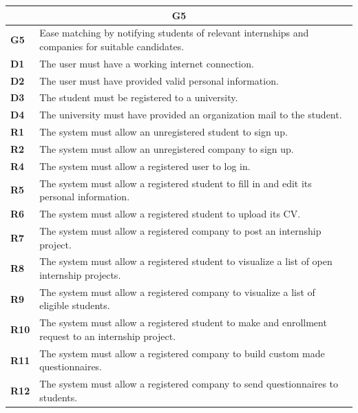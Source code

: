 \begin{table}[H]
    \centering
    \begin{tabular}{|l|m{10cm}|}
        \hline \multicolumn{2}{|c|}{\textbf{G5}} \\
        \hline \textbf{G5} & Ease matching by notifying students of relevant internships and companies for suitable candidates. \\
        \hline \textbf{D1} & The user must have a working internet connection. \\
        \hline \textbf{D2} & The user must have provided valid personal information. \\
        \hline \textbf{D3} & The student must be registered to a university. \\
        \hline \textbf{D4} & The university must have provided an organization mail to the student. \\
        \hline \textbf{R1} & The system must allow an unregistered student to sign up.\\
        \hline \textbf{R2} & The system must allow an unregistered company to sign up. \\
        \hline \textbf{R4} & The system must allow a registered user to log in. \\
        \hline \textbf{R5} & The system must allow a registered student to fill in and edit its personal information. \\
        \hline \textbf{R6} & The system must allow a registered student to upload its CV. \\
        \hline \textbf{R7} & The system must allow a registered company to post an internship project. \\
        \hline \textbf{R8} & The system must allow a registered student to visualize a list of open internship projects. \\
        \hline \textbf{R9} & The system must allow a registered company to visualize a list of eligible students. \\
        \hline \textbf{R10} & The system must allow a registered student to make and enrollment request to an internship project. \\
        \hline \textbf{R11} & The system must allow a registered company to build custom made questionnaires. \\
        \hline \textbf{R12} & The system must allow a registered company to send questionnaires to students. \\

\end{tabular}
\end{table}
